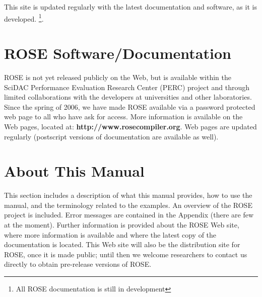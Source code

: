 This site is updated regularly with the latest documentation and software, as it is 
developed.
\footnote{All ROSE documentation is still in development}.


\section{ROSE Software/Documentation}
     ROSE is not yet released publicly on the Web, but is available
within the SciDAC Performance Evaluation Research Center (PERC) 
project and through limited collaborations with the developers
at universities and other laboratories.  Since the spring of 2006, we have made ROSE 
available via a password protected web page to all who have ask for access.
More information is available on the
Web pages, located at:
{\bf http://www.rosecompiler.org}.
Web pages are updated regularly (postscript versions of 
documentation are available as well).

\section{About This Manual}

   This section includes a description of what this manual
provides, how to use the manual, and the terminology related to
the examples.  
An overview of the ROSE project is included. Error messages 
are contained in the Appendix (there are few at the moment).  
Further information is provided about
the ROSE Web site, where more information is available and where
the latest copy of the documentation is located.  This Web site will also be the
distribution site for ROSE, once it is made public; until then we welcome 
researchers to contact us directly to obtain pre-release versions of ROSE.

